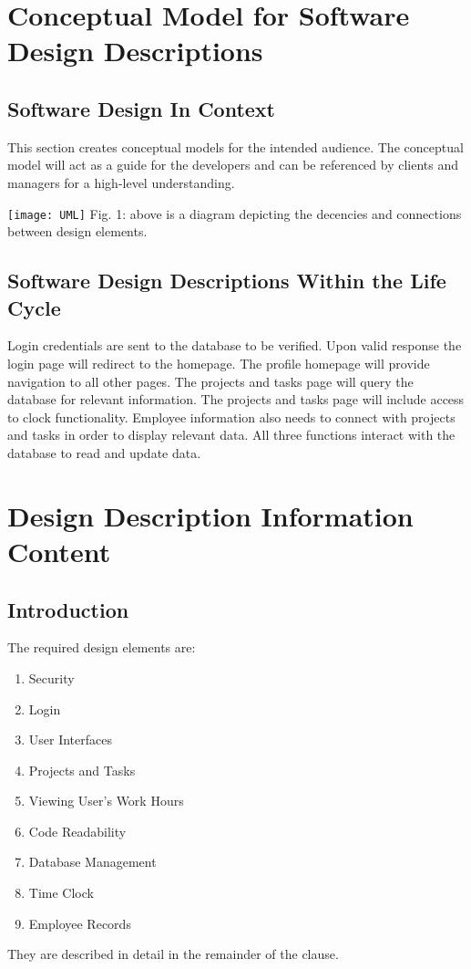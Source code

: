 \documentclass[letterpaper,10pt,titlepage,journal,compsoc,draftclsnofoot,onecolumn]{IEEEtran}
\begin{document}
\section{Conceptual Model for Software Design Descriptions}
\subsection{Software Design In Context}

This section creates conceptual models for the intended audience. The conceptual model will act as a guide for the developers and can be referenced by clients and managers for a high-level understanding.

\texttt{[image: UML]}
\newline Fig. 1: above is a diagram depicting the decencies and connections between design elements.
\subsection{Software Design Descriptions Within the Life Cycle}

Login credentials are sent to the database to be verified. Upon valid response the login page will redirect to the homepage. The profile homepage will provide navigation to all other pages. The projects and tasks page will query the database for relevant information. The projects and tasks page will include access to clock functionality. Employee information also needs to connect with projects and tasks in order to display relevant data. All three functions interact with the database to read and update data. 

\section{Design Description Information Content}
\subsection{Introduction}

The required design elements are:
\begin{enumerate}
\item{Security}
\item{Login}
\item{User Interfaces}
\item{Projects and Tasks}
\item{Viewing User's Work Hours}
\item{Code Readability}
\item{Database Management}
\item{Time Clock}
\item{Employee Records}
\end{enumerate}
They are described in detail in the remainder of the clause.
\end{document}

